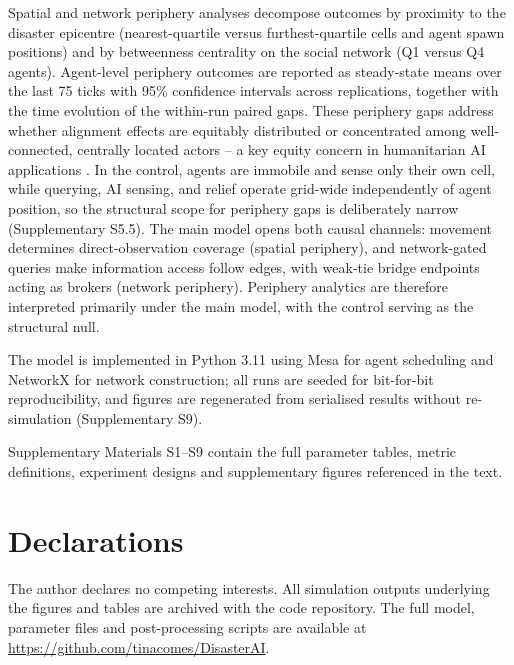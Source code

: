 \documentclass[sn-apacite]{sn-jnl}
\begin{document}
Spatial and network periphery analyses decompose outcomes by proximity to the disaster epicentre (nearest-quartile versus furthest-quartile cells and agent spawn positions) and by betweenness centrality on the social network (Q1 versus Q4 agents). Agent-level periphery outcomes are reported as steady-state means over the last 75 ticks with 95\% confidence intervals across replications, together with the time evolution of the within-run paired gaps. These periphery gaps address whether alignment effects are equitably distributed or concentrated among well-connected, centrally located actors -- a key equity concern in humanitarian AI applications \citep{coleman2024weaving}. In the control, agents are immobile and sense only their own cell, while querying, AI sensing, and relief operate grid-wide independently of agent position, so the structural scope for periphery gaps is deliberately narrow (Supplementary S5.5). The main model opens both causal channels: movement determines direct-observation coverage (spatial periphery), and network-gated queries make information access follow edges, with weak-tie bridge endpoints acting as brokers (network periphery). Periphery analytics are therefore interpreted primarily under the main model, with the control serving as the structural null.

The model is implemented in Python 3.11 using Mesa for agent scheduling and NetworkX for network construction; all runs are seeded for bit-for-bit reproducibility, and figures are regenerated from serialised results without re-simulation (Supplementary S9).

\backmatter

Supplementary Materials S1--S9 contain the full parameter tables, metric definitions, experiment designs and supplementary figures referenced in the text.


\section*{Declarations}

 The author declares no competing interests.
 All simulation outputs underlying the figures and tables are archived with the code repository.
 The full model, parameter files and post-processing scripts are available at \url{https://github.com/tinacomes/DisasterAI}.

\end{document}
